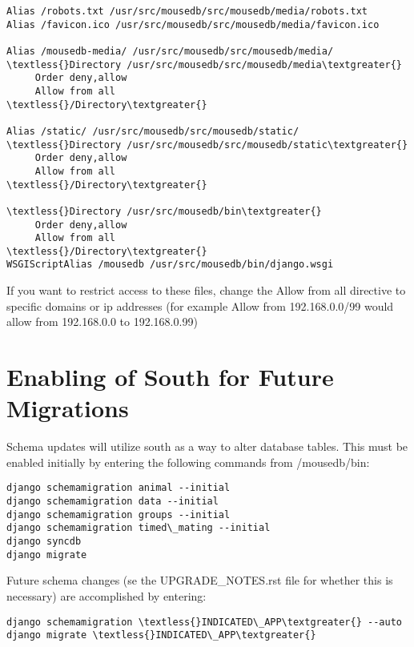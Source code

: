 \documentclass[letterpaper,10pt,english]{sphinxmanual}
\begin{document}
\begin{Verbatim}[commandchars=\\\{\}]
Alias /robots.txt /usr/src/mousedb/src/mousedb/media/robots.txt
Alias /favicon.ico /usr/src/mousedb/src/mousedb/media/favicon.ico

Alias /mousedb-media/ /usr/src/mousedb/src/mousedb/media/
\textless{}Directory /usr/src/mousedb/src/mousedb/media\textgreater{}
     Order deny,allow
     Allow from all
\textless{}/Directory\textgreater{}

Alias /static/ /usr/src/mousedb/src/mousedb/static/
\textless{}Directory /usr/src/mousedb/src/mousedb/static\textgreater{}
     Order deny,allow
     Allow from all
\textless{}/Directory\textgreater{}

\textless{}Directory /usr/src/mousedb/bin\textgreater{}
     Order deny,allow
     Allow from all
\textless{}/Directory\textgreater{}
WSGIScriptAlias /mousedb /usr/src/mousedb/bin/django.wsgi
\end{Verbatim}

If you want to restrict access to these files, change the Allow from all directive to specific domains or ip addresses (for example Allow from 192.168.0.0/99 would allow from 192.168.0.0 to 192.168.0.99)


\section{Enabling of South for Future Migrations}
\label{installation:enabling-of-south-for-future-migrations}
Schema updates will utilize south as a way to alter database tables.  This must be enabled initially by entering the following commands from /mousedb/bin:

\begin{Verbatim}[commandchars=\\\{\}]
django schemamigration animal --initial
django schemamigration data --initial
django schemamigration groups --initial
django schemamigration timed\_mating --initial
django syncdb
django migrate
\end{Verbatim}

Future schema changes (se the UPGRADE\_NOTES.rst file for whether this is necessary) are accomplished by entering:

\begin{Verbatim}[commandchars=\\\{\}]
django schemamigration \textless{}INDICATED\_APP\textgreater{} --auto
django migrate \textless{}INDICATED\_APP\textgreater{}
\end{Verbatim}
\end{document}
